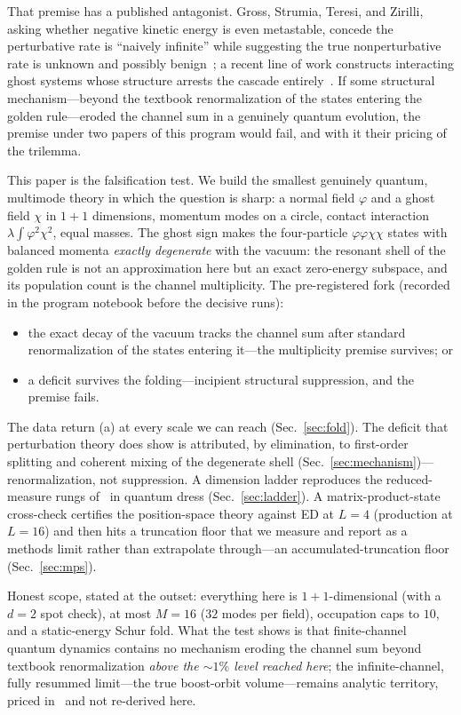 \documentclass[11pt]{article}
\begin{document}
That premise has a published antagonist. Gross, Strumia, Teresi,
and Zirilli, asking whether negative kinetic energy is even
metastable, concede the perturbative rate is ``naively infinite''
while suggesting the true nonperturbative rate is unknown and
possibly benign~\cite{GSTZ2021}; a recent line of work constructs
interacting ghost systems whose structure arrests the cascade
entirely~\cite{Deffayet2026,EwasiukProfumo2026}. If some
structural mechanism---beyond the textbook renormalization of the
states entering the golden rule---eroded the channel sum in a
genuinely quantum evolution, the premise under two papers of this
program would fail, and with it their pricing of the trilemma.

This paper is the falsification test. We build the smallest
genuinely quantum, multimode theory in which the question is
sharp: a normal field $\varphi$ and a ghost field $\chi$ in
$1{+}1$ dimensions, momentum modes on a circle, contact
interaction $\lambda\int\varphi^2\chi^2$, equal masses. The ghost
sign makes the four-particle $\varphi\varphi\chi\chi$ states with
balanced momenta \emph{exactly degenerate} with the vacuum: the
resonant shell of the golden rule is not an approximation here
but an exact zero-energy subspace, and its population count is
the channel multiplicity. The pre-registered fork
(recorded in the program notebook before the decisive runs):
\begin{itemize}
\item[(a)] the exact decay of the vacuum tracks the channel sum
after standard renormalization of the states entering it---the
multiplicity premise survives; or
\item[(b)] a deficit survives the folding---incipient structural
suppression, and the premise fails.
\end{itemize}
The data return (a) at every scale we can reach
(Sec.~\ref{sec:fold}). The deficit that perturbation theory does
show is attributed, by elimination, to first-order splitting and
coherent mixing of the degenerate shell
(Sec.~\ref{sec:mechanism})---renormalization, not suppression. A
dimension ladder reproduces the reduced-measure rungs
of~\cite{instantaneous} in quantum dress (Sec.~\ref{sec:ladder}). A
matrix-product-state cross-check certifies the position-space
theory against ED at $L=4$ (production at $L=16$) and then hits a truncation floor that we
measure and report as a methods limit rather than extrapolate
through---an accumulated-truncation floor (Sec.~\ref{sec:mps}).

Honest scope, stated at the outset: everything here is
$1{+}1$-dimensional (with a $d=2$ spot check), at most $M=16$
($32$ modes per field), occupation caps to $10$, and a static-energy Schur fold.
What the test shows is that finite-channel quantum dynamics
contains no mechanism eroding the channel sum beyond textbook
renormalization \emph{above the ${\sim}1\%$ level reached here}; the
infinite-channel, fully resummed limit---the
true boost-orbit volume---remains analytic territory, priced
in~\cite{instantaneous} and not re-derived here.
\end{document}
